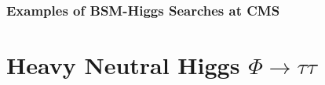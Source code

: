 \documentclass{beamer}
\begin{document}
\begin{frame}
  \frametitle{Examples of BSM-Higgs Searches at CMS}
  \begin{center}
  \end{center}
\end{frame}

\section{Heavy Neutral Higgs \texorpdfstring{$\Phi\rightarrow\tau\tau$}{to 2 Tau-Leptons}}
\end{document}
